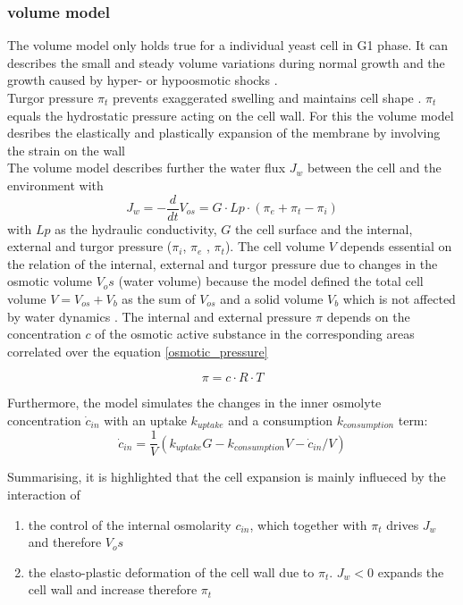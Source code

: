 \subsubsection{volume model}
The volume model only holds true for a individual yeast cell in G1 phase. It can describes the small and steady volume variations during normal growth and the growth caused by hyper- or hypoosmotic shocks \cite{volumeModel}.\\
Turgor pressure $\pi_t$ prevents exaggerated swelling and maintains cell shape \cite{volumeModel}. $\pi_t$ equals the hydrostatic pressure acting on the cell wall. For this the volume model desribes the elastically and plastically expansion of the membrane by involving the strain on the wall\\
The volume model \cite{volumeModel} describes further the water flux $J_w$ between the cell and the environment with 
\begin{equation}\label{waterFlux}
	J_{w} = - \frac{d}{dt} V_{os} = G \cdot Lp \cdot (\pi_e + \pi_t - \pi_i)
\end{equation}
with $Lp$ as the hydraulic conductivity, $G$ the cell surface and the internal, external and turgor pressure  ($\pi_i$, $\pi_e$ , $\pi_t$). 
The cell volume $V$ depends essential on the relation of the internal, external and turgor pressure due to changes in the osmotic volume $V_os$ (water volume) because the model defined the total cell volume $V = V_{os} + V_b$ as the sum of $V_{os}$ and a solid volume $V_b$ which is not affected by water dynamics \cite{volumeModel}. The internal and external pressure $\pi$ depends on the concentration $c$ of the osmotic active substance in the corresponding areas correlated over the equation \ref{osmotic_pressure}

\begin{equation} \label{osmotic_pressure}
	\pi = c \cdot R \cdot T	
\end{equation} 

Furthermore, the model simulates the changes in the inner osmolyte concentration $\dot c_{in}$ with an uptake $k_{uptake}$ and a consumption $k_{consumption}$ term:
\begin{equation*}
	\dot c_{in} = \frac{1}{V}(k_{uptake}G - k_{consumption}V-\dot c_{in}/{V})
\end{equation*}

Summarising, it is highlighted that the cell expansion is mainly influeced by the interaction of
\begin{enumerate}
	\item the control of the internal osmolarity $c_{in}$, which together with $\pi_t$ drives $J_w$ and therefore $V_os$
	\item the elasto-plastic deformation of the cell wall due to $\pi_t$. $J_w < 0$ expands the cell wall and increase therefore $\pi_t$
\end{enumerate}

